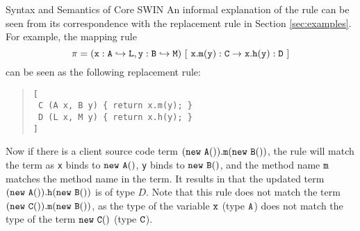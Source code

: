 \begin{section}{Syntax and Semantics of Core SWIN}
An informal explanation of the rule can be seen from its correspondence 
with the replacement rule in Section \ref{sec:examples}. 
For example, the mapping rule
\[
\tt
\pi=(x:A\hookrightarrow
L,y:B\hookrightarrow M)\ [\ x.m(y):C \rightarrow x.h(y):D\ ]
\]
can be seen as the following replacement rule:
\begin{quote}
\begin{lstlisting}
[ 
 C (A x, B y) { return x.m(y); }
 D (L x, M y) { return x.h(y); }
]
\end{lstlisting}
\end{quote}
Now if there is a client source code term $\tt
(new\ A()).m(new\ B())$, the rule will match the term as \verb|x| binds to
$\tt new\ A()$, \verb|y| binds to $\tt new\ B()$, and the method name
$\tt m$ matches the method name in the term. It results in that the updated term
$\tt (new\ A()).h(new\ B())$ is of type $D$.
Note that this rule 
does not match the term $\tt (new\ C()).m(new\ B())$, as the type
of the variable $\tt x$ (type $\tt A$) does not
match the type of the term $\tt new\ C()$ (type $\tt C$).  
%


\end{section}
